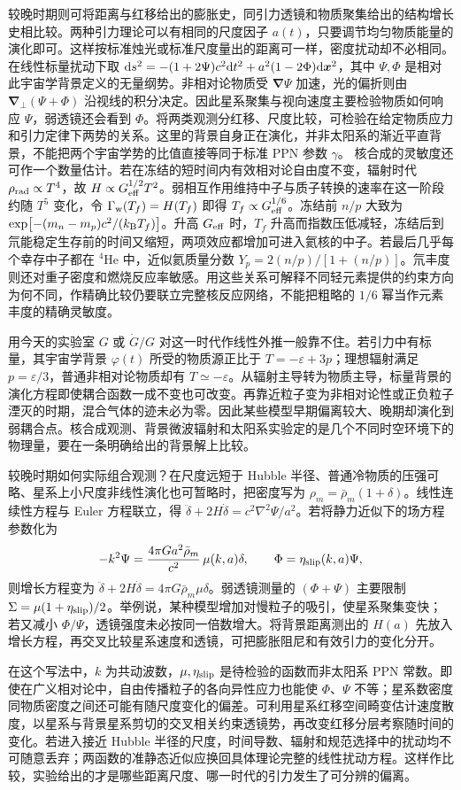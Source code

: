 较晚时期则可将距离与红移给出的膨胀史，同引力透镜和物质聚集给出的结构增长史相比较。两种引力理论可以有相同的尺度因子 $a(t)$，只要调节均匀物质能量的演化即可。这样按标准烛光或标准尺度量出的距离可一样，密度扰动却不必相同。在线性标量扰动下取 $\dd s^2=-(1+2\Psi)c^2\dd t^2+a^2(1-2\Phi)\dd\bm x^2$，其中 $\Psi,\Phi$ 是相对此宇宙学背景定义的无量纲势。非相对论物质受 $\bm\nabla\Psi$ 加速，光的偏折则由 $\bm\nabla_\perp(\Psi+\Phi)$ 沿视线的积分决定。因此星系聚集与视向速度主要检验物质如何响应 $\Psi$，弱透镜还会看到 $\Phi$。将两类观测分红移、尺度比较，可检验在给定物质应力和引力定律下两势的关系。这里的背景自身正在演化，并非太阳系的渐近平直背景，不能把两个宇宙学势的比值直接等同于标准 PPN 参数 $\gamma$。
核合成的灵敏度还可作一个数量估计。若在冻结的短时间内有效相对论自由度不变，辐射时代 $\rho_{\rm rad}\propto T^4$，故 $H\propto G_{\rm eff}^{1/2}T^2$。弱相互作用维持中子与质子转换的速率在这一阶段约随 $T^5$ 变化，令 $\Gamma_{\rm w}(T_f)=H(T_f)$ 即得 $T_f\propto G_{\rm eff}^{1/6}$。冻结前 $n/p$ 大致为 $\exp[-(m_n-m_p)c^2/(k_{\rm B}T_f)]$。升高 $G_{\rm eff}$ 时，$T_f$ 升高而指数压低减轻，冻结后到氘能稳定生存前的时间又缩短，两项效应都增加可进入氦核的中子。若最后几乎每个幸存中子都在 $^4$He 中，近似氦质量分数 $Y_p=2(n/p)/[1+(n/p)]$。氘丰度则还对重子密度和燃烧反应率敏感。用这些关系可解释不同轻元素提供的约束方向为何不同，作精确比较仍要联立完整核反应网络，不能把粗略的 $1/6$ 幂当作元素丰度的精确灵敏度。

用今天的实验室 $G$ 或 $\dot G/G$ 对这一时代作线性外推一般靠不住。若引力中有标量，其宇宙学背景 $\varphi(t)$ 所受的物质源正比于 $T=-\varepsilon+3p$；理想辐射满足 $p=\varepsilon/3$，普通非相对论物质却有 $T\simeq-\varepsilon$。从辐射主导转为物质主导，标量背景的演化方程即使耦合函数一成不变也可改变。再靠近粒子变为非相对论性或正负粒子湮灭的时期，混合气体的迹未必为零。因此某些模型早期偏离较大、晚期却演化到弱耦合点。核合成观测、背景微波辐射和太阳系实验定的是几个不同时空环境下的物理量，要在一条明确给出的背景解上比较。

较晚时期如何实际组合观测？在尺度远短于 Hubble 半径、普通冷物质的压强可略、星系上小尺度非线性演化也可暂略时，把密度写为 $\rho_m=\bar\rho_m(1+\delta)$。线性连续性方程与 Euler 方程联立，得 $\ddot\delta+2H\dot\delta=c^2\nabla^2\Psi/a^2$。若将静力近似下的场方程参数化为
\[
 -k^2\Psi=\frac{4\pi G a^2\bar\rho_m}{c^2}\,
               \mu(k,a)\delta,\qquad
 \Phi=\eta_{\rm slip}(k,a)\Psi ,
\]
则增长方程变为 $\ddot\delta+2H\dot\delta=4\pi G\bar\rho_m\mu\delta$。弱透镜测量的 $(\Phi+\Psi)$ 主要限制 $\Sigma=\mu(1+\eta_{\rm slip})/2$。举例说，某种模型增加对慢粒子的吸引，使星系聚集变快；若又减小 $\Phi/\Psi$，透镜强度未必按同一倍数增大。将背景距离测出的 $H(a)$ 先放入增长方程，再交叉比较星系速度和透镜，可把膨胀阻尼和有效引力的变化分开。

在这个写法中，$k$ 为共动波数，$\mu,\eta_{\rm slip}$ 是待检验的函数而非太阳系 PPN 常数。即使在广义相对论中，自由传播粒子的各向异性应力也能使 $\Phi$、$\Psi$ 不等；星系数密度同物质密度之间还可能有随尺度变化的偏差。可利用星系红移空间畸变估计速度散度，以星系与背景星系剪切的交叉相关约束透镜势，再改变红移分层考察随时间的变化。若进入接近 Hubble 半径的尺度，时间导数、辐射和规范选择中的扰动均不可随意丢弃；两函数的准静态近似应换回具体理论完整的线性扰动方程。这样作比较，实验给出的才是哪些距离尺度、哪一时代的引力发生了可分辨的偏离。
